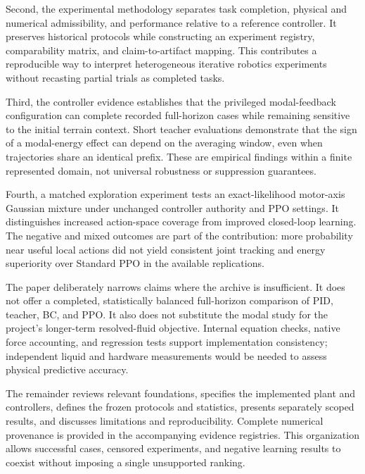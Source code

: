 Second, the experimental methodology separates task completion, physical and numerical admissibility, and performance relative to a reference controller. It preserves historical protocols while constructing an experiment registry, comparability matrix, and claim-to-artifact mapping. This contributes a reproducible way to interpret heterogeneous iterative robotics experiments without recasting partial trials as completed tasks.

Third, the controller evidence establishes that the privileged modal-feedback configuration can complete recorded full-horizon cases while remaining sensitive to the initial terrain context. Short teacher evaluations demonstrate that the sign of a modal-energy effect can depend on the averaging window, even when trajectories share an identical prefix. These are empirical findings within a finite represented domain, not universal robustness or suppression guarantees.

Fourth, a matched exploration experiment tests an exact-likelihood motor-axis Gaussian mixture under unchanged controller authority and PPO settings. It distinguishes increased action-space coverage from improved closed-loop learning. The negative and mixed outcomes are part of the contribution: more probability near useful local actions did not yield consistent joint tracking and energy superiority over Standard PPO in the available replications.

The paper deliberately narrows claims where the archive is insufficient. It does not offer a completed, statistically balanced full-horizon comparison of PID, teacher, BC, and PPO. It also does not substitute the modal study for the project's longer-term resolved-fluid objective. Internal equation checks, native force accounting, and regression tests support implementation consistency; independent liquid and hardware measurements would be needed to assess physical predictive accuracy.

The remainder reviews relevant foundations, specifies the implemented plant and controllers, defines the frozen protocols and statistics, presents separately scoped results, and discusses limitations and reproducibility. Complete numerical provenance is provided in the accompanying evidence registries. This organization allows successful cases, censored experiments, and negative learning results to coexist without imposing a single unsupported ranking.
